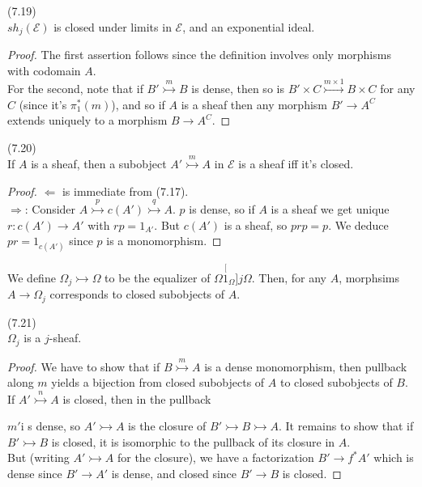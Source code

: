 \documentclass[a4paper]{article}
\begin{document}
\begin{lemma} (7.19)\\
    $sh_j(\mathcal{E})$ is closed under limits in $\mathcal{E}$, and an exponential ideal.
    \begin{proof}
        The first assertion follows since the definition involves only morphisms with codomain $A$.\\
        For the second, note that if $B' \stackrel{m}{\rightarrowtail} B$ is dense, then so is $B'\times C \stackrel{m \times 1}{\rightarrowtail} B \times C$ for any $C$ (since it's $\pi_1^*(m)$), and so if $A$ is a sheaf then any morphism $B' \to A^C$ extends uniquely to a morphism $B \to A^C$.
    \end{proof}
\end{lemma}

\begin{lemma} (7.20)\\
    If $A$ is a sheaf, then a subobject $A' \stackrel{m}{\rightarrowtail} A$ in $\mathcal{E}$ is a sheaf iff it's closed.
    \begin{proof}
        $\Leftarrow$ is immediate from (7.17).\\
        $\Rightarrow$: Consider $A \stackrel{p}{\rightarrowtail} c(A') \stackrel{q}{\rightarrowtail} A$. $p$ is dense, so if $A$ is a sheaf we get unique $r:c(A') \to A'$ with $rp = 1_{A'}$. But $c(A')$ is a sheaf, so $prp = p$. We deduce $pr = 1_{c(A')}$ since $p$ is a monomorphism.
    \end{proof}
\end{lemma}

We define $\Omega_j \rightarrowtail \Omega$ to be the equalizer of $\Omega \stackrel[1_\Omega]{j} \Omega$. Then, for any $A$, morphsims $A \to \Omega_j$ corresponds to closed subobjects of $A$.

\begin{lemma} (7.21)\\
    $\Omega_j$ is a $j$-sheaf.
    \begin{proof}
        We have to show that if $B \stackrel{m}{\rightarrowtail} A$ is a dense monomorphism, then pullback along $m$ yields a bijection from closed subobjects of $A$ to closed subobjects of $B$.\\
        If $A' \stackrel{n}{\rightarrowtail} A$ is closed, then in the pullback


        $m'$i s dense, so $A' \rightarrowtail A$ is the closure of $B' \rightarrowtail B \rightarrowtail A$. It remains to show that if $B' \rightarrowtail B$ is closed, it is isomorphic to the pullback of its closure in $A$.\\
        But (writing $A' \rightarrowtail A$ for the closure), we have a factorization $B' \to f^* A'$ which is dense since $B' \to A'$ is dense, and closed since $B' \to B$ is closed.
    \end{proof}
\end{lemma}
\end{document}
